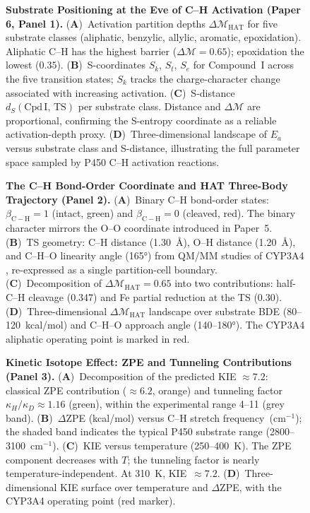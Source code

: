 
\begin{figure}[htbp]
\caption{\textbf{Substrate Positioning at the Eve of C--H Activation (Paper 6, Panel 1).}
(\textbf{A})~Activation partition depths $\Delta\mathcal{M}_{\mathrm{HAT}}$ for five
substrate classes (aliphatic, benzylic, allylic, aromatic, epoxidation). Aliphatic
C--H has the highest barrier ($\Delta\mathcal{M} = 0.65$); epoxidation the lowest
($0.35$).
(\textbf{B})~S-coordinates $S_k$, $S_t$, $S_e$ for Compound~I across the five
transition states; $S_k$ tracks the charge-character change associated with increasing
activation.
(\textbf{C})~S-distance $d_S(\mathrm{Cpd\,I},\,\mathrm{TS})$ per substrate class.
Distance and $\Delta\mathcal{M}$ are proportional, confirming the S-entropy coordinate
as a reliable activation-depth proxy.
(\textbf{D})~Three-dimensional landscape of $E_a$ versus substrate class and S-distance,
illustrating the full parameter space sampled by P450 C--H activation reactions.}
\label{fig:substrate_positioning}
\end{figure}

\begin{figure}[htbp]
\caption{\textbf{The C--H Bond-Order Coordinate and HAT Three-Body Trajectory (Panel 2).}
(\textbf{A})~Binary C--H bond-order states: $\beta_{\mathrm{C-H}} = 1$ (intact, green)
and $\beta_{\mathrm{C-H}} = 0$ (cleaved, red). The binary character mirrors the O--O
coordinate introduced in Paper~5.
(\textbf{B})~TS geometry: C--H distance (1.30~\AA{}), O--H distance (1.20~\AA{}),
and C--H--O linearity angle (165°) from QM/MM studies of CYP3A4
\citep{shaik2010}, re-expressed as a single partition-cell boundary.
(\textbf{C})~Decomposition of $\Delta\mathcal{M}_{\mathrm{HAT}} = 0.65$ into two
contributions: half-C--H cleavage (0.347) and Fe partial reduction at the TS (0.30).
(\textbf{D})~Three-dimensional $\Delta\mathcal{M}_{\mathrm{HAT}}$ landscape over
substrate BDE (80--120~kcal/mol) and C--H--O approach angle (140--180°). The CYP3A4
aliphatic operating point is marked in red.}
\label{fig:hat_coordinate}
\end{figure}

\begin{figure}[htbp]
\caption{\textbf{Kinetic Isotope Effect: ZPE and Tunneling Contributions (Panel 3).}
(\textbf{A})~Decomposition of the predicted KIE $\approx 7.2$: classical ZPE
contribution ($\approx 6.2$, orange) and tunneling factor $\kappa_H/\kappa_D \approx
1.16$ (green), within the experimental range 4--11 (grey band).
(\textbf{B})~$\Delta$ZPE (kcal/mol) versus C--H stretch frequency~(cm$^{-1}$); the
shaded band indicates the typical P450 substrate range (2800--3100~cm$^{-1}$).
(\textbf{C})~KIE versus temperature (250--400~K). The ZPE component decreases with
$T$; the tunneling factor is nearly temperature-independent. At 310~K, KIE~$\approx
7.2$.
(\textbf{D})~Three-dimensional KIE surface over temperature and $\Delta$ZPE,
with the CYP3A4 operating point (red marker).}
\label{fig:kie}
\end{figure}

